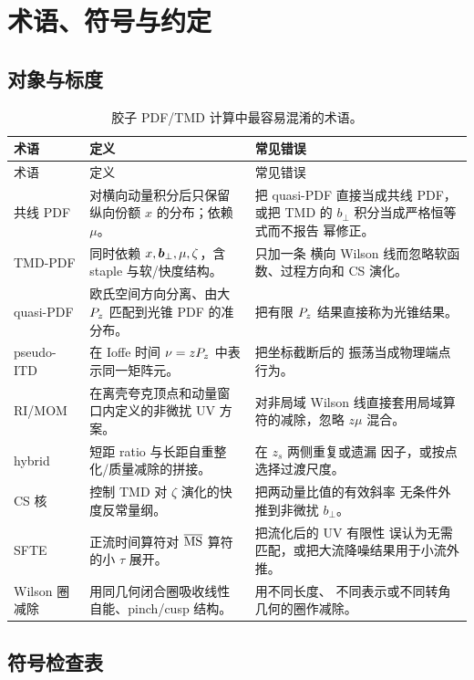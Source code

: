 \chapter{术语、符号与约定}
\section{对象与标度}

\begin{longtable}{@{}p{}p{}p{}@{}}
\caption{胶子 PDF/TMD 计算中最容易混淆的术语。}\label{tab:b10-terms}\\
\toprule
术语 & 定义 & 常见错误 \\
\midrule
\endfirsthead
\toprule
术语 & 定义 & 常见错误 \\
\midrule
\endhead
共线 PDF & 对横向动量积分后只保留纵向份额 $x$ 的分布；依赖 $\mu$。 & 把
quasi-PDF 直接当成共线 PDF，或把 TMD 的 $b_\perp$ 积分当成严格恒等式而不报告
幂修正。 \\
TMD-PDF & 同时依赖 $x,\boldsymbol b_\perp,\mu,\zeta$，含 staple 与软/快度结构。 & 只加一条
横向 Wilson 线而忽略软函数、过程方向和 CS 演化。 \\
quasi-PDF & 欧氏空间方向分离、由大 $P_z$ 匹配到光锥 PDF 的准分布。 & 把有限
$P_z$ 结果直接称为光锥结果。 \\
pseudo-ITD & 在 Ioffe 时间 $\nu=zP_z$ 中表示同一矩阵元。 & 把坐标截断后的
振荡当成物理端点行为。 \\
RI/MOM & 在离壳夸克顶点和动量窗口内定义的非微扰 UV 方案。 & 对非局域 Wilson
线直接套用局域算符的减除，忽略 $z\mu$ 混合。 \\
hybrid & 短距 ratio 与长距自重整化/质量减除的拼接。 & 在 $z_s$ 两侧重复或遗漏
因子，或按点选择过渡尺度。 \\
CS 核 & 控制 TMD 对 $\zeta$ 演化的快度反常量纲。 & 把两动量比值的有效斜率
无条件外推到非微扰 $b_\perp$。 \\
SFTE & 正流时间算符对 $\overline{\mathrm{MS}}$ 算符的小 $\tau$ 展开。 & 把流化后的 UV 有限性
误认为无需匹配，或把大流降噪结果用于小流外推。 \\
Wilson 圈减除 & 用同几何闭合圈吸收线性自能、pinch/cusp 结构。 & 用不同长度、
不同表示或不同转角几何的圈作减除。 \\
\bottomrule
\end{longtable}

\section{符号检查表}

